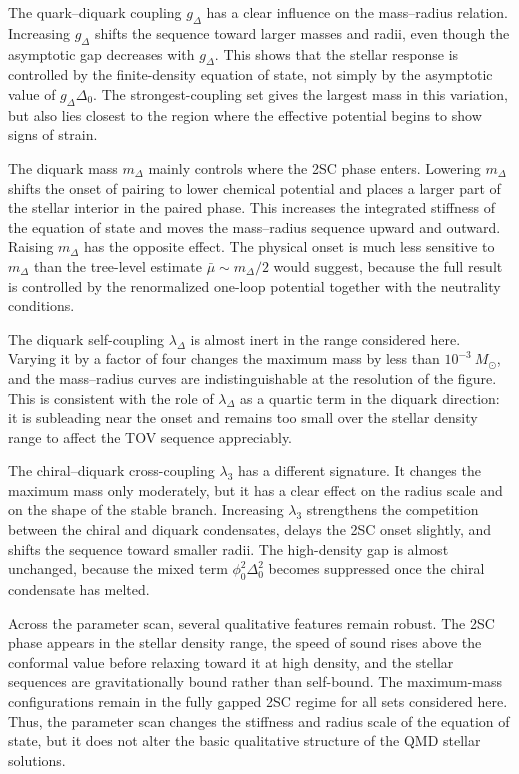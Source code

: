 The quark--diquark coupling \(g_\Delta\) has a clear influence on the
mass--radius relation. Increasing \(g_\Delta\) shifts the sequence toward
larger masses and radii, even though the asymptotic gap decreases with
\(g_\Delta\). This shows that the stellar response is controlled by the
finite-density equation of state, not simply by the asymptotic value of
\(g_\Delta\Delta_0\). The strongest-coupling set gives the largest mass
in this variation, but also lies closest to the region where the
effective potential begins to show signs of strain.

The diquark mass \(m_\Delta\) mainly controls where the 2SC phase enters.
Lowering \(m_\Delta\) shifts the onset of pairing to lower chemical
potential and places a larger part of the stellar interior in the paired
phase. This increases the integrated stiffness of the equation of state
and moves the mass--radius sequence upward and outward. Raising
\(m_\Delta\) has the opposite effect. The physical onset is much less
sensitive to \(m_\Delta\) than the tree-level estimate
\(\bar{\mu}\sim m_\Delta/2\) would suggest, because the full result is
controlled by the renormalized one-loop potential together with the
neutrality conditions.

The diquark self-coupling \(\lambda_\Delta\) is almost inert in the
range considered here. Varying it by a factor of four changes the
maximum mass by less than \(10^{-3}~M_\odot\), and the mass--radius
curves are indistinguishable at the resolution of the figure. This is
consistent with the role of \(\lambda_\Delta\) as a quartic term in the
diquark direction: it is subleading near the onset and remains too small
over the stellar density range to affect the TOV sequence appreciably.

The chiral--diquark cross-coupling \(\lambda_3\) has a different
signature. It changes the maximum mass only moderately, but it has a
clear effect on the radius scale and on the shape of the stable branch.
Increasing \(\lambda_3\) strengthens the competition between the chiral
and diquark condensates, delays the 2SC onset slightly, and shifts the
sequence toward smaller radii. The high-density gap is almost unchanged,
because the mixed term \(\phi_0^2\Delta_0^2\) becomes suppressed once
the chiral condensate has melted.

Across the parameter scan, several qualitative features remain robust. The 2SC
phase appears in the stellar density range, the speed of sound rises above the
conformal value before relaxing toward it at high density, and the stellar
sequences are gravitationally bound rather than self-bound. The maximum-mass
configurations remain in the fully gapped 2SC regime for all sets considered
here. Thus, the parameter scan changes the stiffness and radius scale of the
equation of state, but it does not alter the basic qualitative structure of the
QMD stellar solutions.

